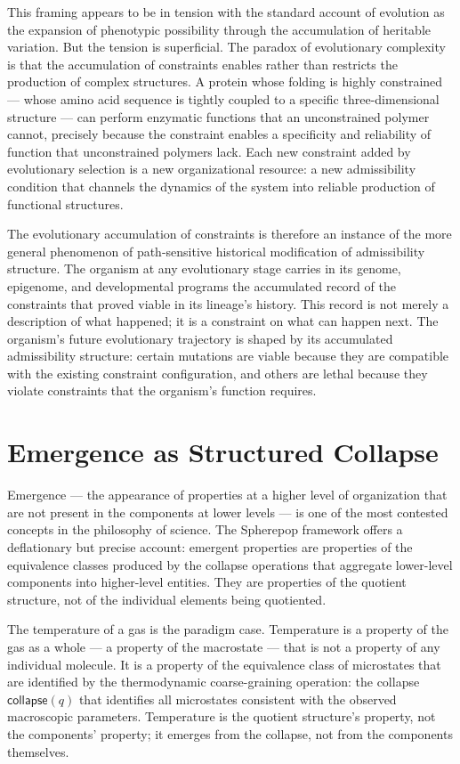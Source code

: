 \documentclass[12pt,openany]{book}
\theoremstyle{plain}
\theoremstyle{definition}
\theoremstyle{remark}
\newcommand{\scollapse}[1]{\mathsf{collapse}\!\left(#1\right)}
\begin{document}
This framing appears to be in tension with the standard account of evolution as the expansion of phenotypic possibility through the accumulation of heritable variation. But the tension is superficial. The paradox of evolutionary complexity is that the accumulation of constraints enables rather than restricts the production of complex structures. A protein whose folding is highly constrained — whose amino acid sequence is tightly coupled to a specific three-dimensional structure — can perform enzymatic functions that an unconstrained polymer cannot, precisely because the constraint enables a specificity and reliability of function that unconstrained polymers lack. Each new constraint added by evolutionary selection is a new organizational resource: a new admissibility condition that channels the dynamics of the system into reliable production of functional structures.

The evolutionary accumulation of constraints is therefore an instance of the more general phenomenon of path-sensitive historical modification of admissibility structure. The organism at any evolutionary stage carries in its genome, epigenome, and developmental programs the accumulated record of the constraints that proved viable in its lineage's history. This record is not merely a description of what happened; it is a constraint on what can happen next. The organism's future evolutionary trajectory is shaped by its accumulated admissibility structure: certain mutations are viable because they are compatible with the existing constraint configuration, and others are lethal because they violate constraints that the organism's function requires.

\section{Emergence as Structured Collapse}

Emergence — the appearance of properties at a higher level of organization that are not present in the components at lower levels — is one of the most contested concepts in the philosophy of science. The Spherepop framework offers a deflationary but precise account: emergent properties are properties of the equivalence classes produced by the collapse operations that aggregate lower-level components into higher-level entities. They are properties of the quotient structure, not of the individual elements being quotiented.

The temperature of a gas is the paradigm case. Temperature is a property of the gas as a whole — a property of the macrostate — that is not a property of any individual molecule. It is a property of the equivalence class of microstates that are identified by the thermodynamic coarse-graining operation: the collapse $\scollapse{q}$ that identifies all microstates consistent with the observed macroscopic parameters. Temperature is the quotient structure's property, not the components' property; it emerges from the collapse, not from the components themselves.
\end{document}
